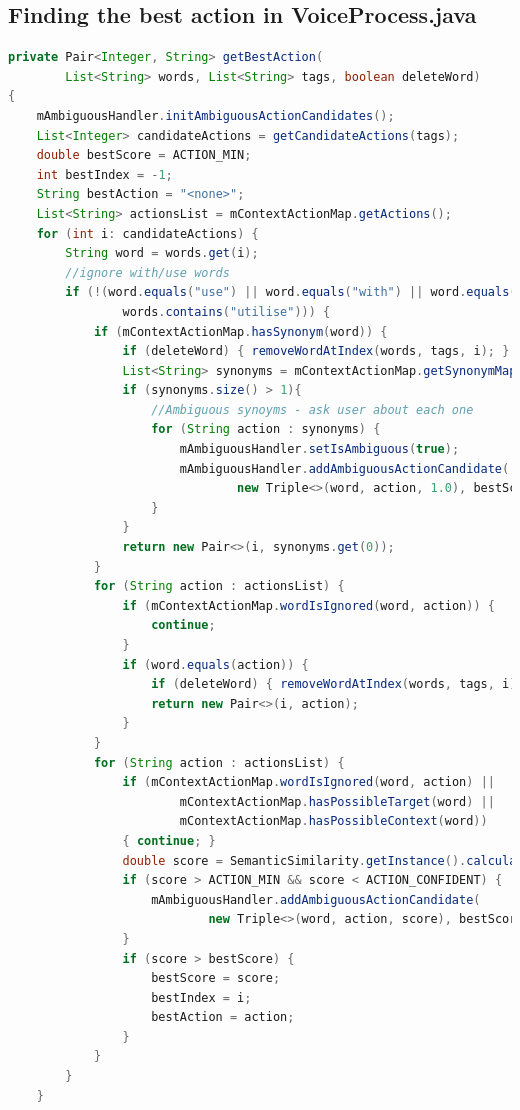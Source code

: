 \documentclass[12pt]{article}
\begin{document}
\newpage
\subsection{Finding the best action in VoiceProcess.java}
\label{appendix:bestActionJava}
\begin{lstlisting}[language=Java, caption=MainActivity.getBestAction()]
private Pair<Integer, String> getBestAction(
        List<String> words, List<String> tags, boolean deleteWord)
{
    mAmbiguousHandler.initAmbiguousActionCandidates();
    List<Integer> candidateActions = getCandidateActions(tags);
    double bestScore = ACTION_MIN;
    int bestIndex = -1;
    String bestAction = "<none>";
    List<String> actionsList = mContextActionMap.getActions();
    for (int i: candidateActions) {
        String word = words.get(i);
        //ignore with/use words
        if (!(word.equals("use") || word.equals("with") || word.equals("using") ||
                words.contains("utilise"))) {
            if (mContextActionMap.hasSynonym(word)) {
                if (deleteWord) { removeWordAtIndex(words, tags, i); }
                List<String> synonyms = mContextActionMap.getSynonymMapping(word);
                if (synonyms.size() > 1){
                    //Ambiguous synoyms - ask user about each one
                    for (String action : synonyms) {
                        mAmbiguousHandler.setIsAmbiguous(true);
                        mAmbiguousHandler.addAmbiguousActionCandidate(
                                new Triple<>(word, action, 1.0), bestScore);
                    }
                }
                return new Pair<>(i, synonyms.get(0));
            }
            for (String action : actionsList) {
                if (mContextActionMap.wordIsIgnored(word, action)) {
                    continue;
                }
                if (word.equals(action)) {
                    if (deleteWord) { removeWordAtIndex(words, tags, i); }
                    return new Pair<>(i, action);
                }
            }
            for (String action : actionsList) {
                if (mContextActionMap.wordIsIgnored(word, action) ||
                        mContextActionMap.hasPossibleTarget(word) ||
                        mContextActionMap.hasPossibleContext(word))
                { continue; }
                double score = SemanticSimilarity.getInstance().calculateScore(action, word);
                if (score > ACTION_MIN && score < ACTION_CONFIDENT) {
                    mAmbiguousHandler.addAmbiguousActionCandidate(
                            new Triple<>(word, action, score), bestScore);
                }
                if (score > bestScore) {
                    bestScore = score;
                    bestIndex = i;
                    bestAction = action;
                }
            }
        }
    }


\end{lstlisting}
\end{document}
